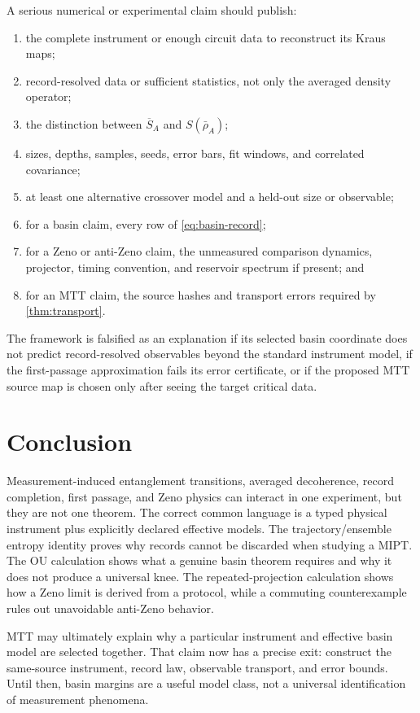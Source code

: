\documentclass[11pt]{article}
\begin{document}
A serious numerical or experimental claim should publish:
\begin{enumerate}
\item the complete instrument or enough circuit data to reconstruct its
Kraus maps;
\item record-resolved data or sufficient statistics, not only the
averaged density operator;
\item the distinction between $\overline S_A$ and $S(\bar\rho_A)$;
\item sizes, depths, samples, seeds, error bars, fit windows, and
correlated covariance;
\item at least one alternative crossover model and a held-out size or
observable;
\item for a basin claim, every row of \cref{eq:basin-record};
\item for a Zeno or anti-Zeno claim, the unmeasured comparison dynamics,
projector, timing convention, and reservoir spectrum if present; and
\item for an MTT claim, the source hashes and transport errors required
by \cref{thm:transport}.
\end{enumerate}

The framework is falsified as an explanation if its selected basin
coordinate does not predict record-resolved observables beyond the
standard instrument model, if the first-passage approximation fails its
error certificate, or if the proposed MTT source map is chosen only
after seeing the target critical data.

\section{Conclusion}

Measurement-induced entanglement transitions, averaged decoherence,
record completion, first passage, and Zeno physics can interact in one
experiment, but they are not one theorem.  The correct common language
is a typed physical instrument plus explicitly declared effective
models.  The trajectory/ensemble entropy identity proves why records
cannot be discarded when studying a MIPT.  The OU calculation shows what
a genuine basin theorem requires and why it does not produce a universal
knee.  The repeated-projection calculation shows how a Zeno limit is
derived from a protocol, while a commuting counterexample rules out
unavoidable anti-Zeno behavior.

MTT may ultimately explain why a particular instrument and effective
basin model are selected together.  That claim now has a precise exit:
construct the same-source instrument, record law, observable transport,
and error bounds.  Until then, basin margins are a useful model class,
not a universal identification of measurement phenomena.



\end{document}

